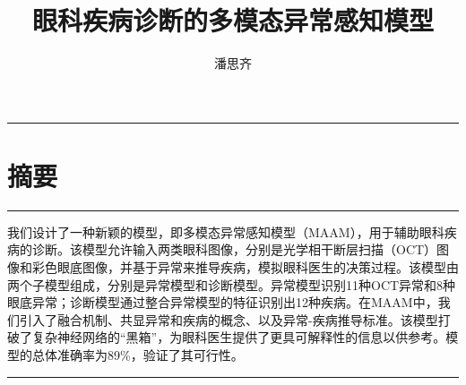 \documentclass{article}
\begin{document}
	\title{\vspace{-2.25cm} 眼科疾病诊断的多模态异常感知模型}
	\author{潘思齐}
	\date{}
	\maketitle
	
	\vspace{-0.2cm}
	\hrule
	\vspace{-0.1cm}
	\section*{摘要}
	\hrule
	\vspace{0.4cm}
	我们设计了一种新颖的模型，即多模态异常感知模型（MAAM），用于辅助眼科疾病的诊断。该模型允许输入两类眼科图像，分别是光学相干断层扫描（OCT）图像和彩色眼底图像，并基于异常来推导疾病，模拟眼科医生的决策过程。该模型由两个子模型组成，分别是异常模型和诊断模型。异常模型识别11种OCT异常和8种眼底异常；诊断模型通过整合异常模型的特征识别出12种疾病。在MAAM中，我们引入了融合机制、共显异常和疾病的概念、以及异常-疾病推导标准。该模型打破了复杂神经网络的“黑箱”，为眼科医生提供了更具可解释性的信息以供参考。模型的总体准确率为89\%，验证了其可行性。
	
	
	\vspace{0.4cm}
	\hrule
	\vspace{1cm}
	
\end{document}
